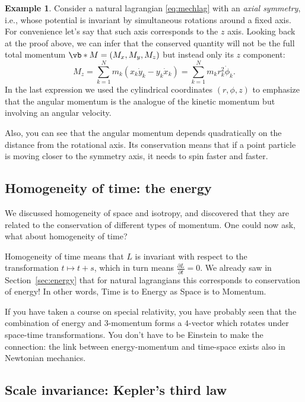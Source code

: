 \documentclass[english,fontsize=11pt,paper=b5]{scrbook}
\theoremstyle{definition}
\newtheorem{example}{Example}[chapter]
\begin{document}
    \begin{example}
      Consider a natural lagrangian \eqref{eq:mechlag} with an \emph{axial symmetry}, i.e., whose potential is invariant by simultaneous rotations around a fixed axis.
      For convenience let's say that such axis corresponds to the $z$ axis.
      Looking back at the proof above, we can infer that the conserved quantity will not be the full total momentum $\vb*{M} = (M_x, M_y, M_z)$ but instead only its $z$ component:
      \begin{equation}
        M_z = \sum_{k=1}^N m_k\left(x_k \dot y_k - y_k \dot x_k\right) =
        \sum_{k=1}^N m_k r_k^2 \dot \phi_k.
      \end{equation}
      In the last expression we used the cylindrical coordinates $(r, \phi, z)$ to emphasize that the angular momentum is the analogue of the kinetic momentum but involving an angular velocity.

      Also, you can see that the angular momentum depends quadratically on the distance from the rotational axis. Its conservation means that if a point particle is moving closer to the symmetry axis, it needs to spin faster and faster.
    \end{example}

    \subsection{Homogeneity of time: the energy}

    We discussed homogeneity of space and isotropy, and discovered that they are related to the conservation of different types of momentum.
    One could now ask, what about homogeneity of time?

    Homogeneity of time means that $L$ is invariant with respect to the transformation $t\mapsto t+s$, which in turn means $\frac{\partial L}{\partial t} = 0$. We already saw in Section~\ref{sec:energy} that for natural lagrangians this corresponds to conservation of energy! In other words, Time is to Energy as Space is to Momentum.

    If you have taken a course on special relativity, you have probably seen that the combination of energy and $3$-momentum forms a $4$-vector which rotates under space-time transformations. You don't have to be Einstein to make the connection: the link between energy-momentum and time-space exists also in Newtonian mechanics.

    \subsection{Scale invariance: Kepler's third law}
\end{document}
